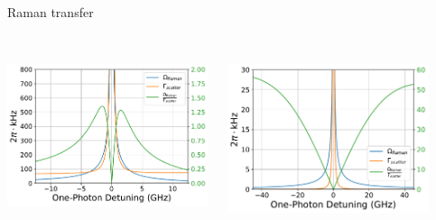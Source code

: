 \documentclass{beamer}
\begin{document}
\begin{frame}[t]{Raman transfer}
  \begin{center}
    \begin{columns}
      \column{5.9cm}
      \begin{center}
        \\
        \vspace{1cm}
        \includegraphics[width=5.9cm]{imgs/raman_vh.pdf}
      \end{center}
      \column{5.9cm}
      \begin{center}
        \\
        \vspace{1cm}
        \includegraphics[width=5.9cm]{imgs/raman_v0.pdf}
      \end{center}
    \end{columns}
  \end{center}
\end{frame}


\end{document}
